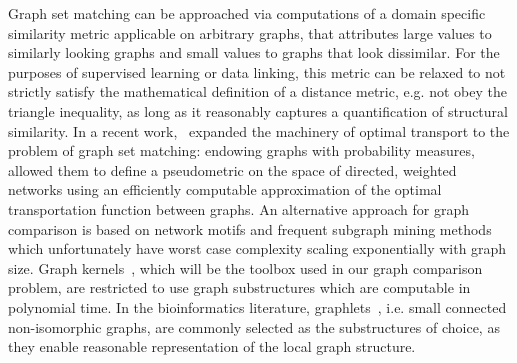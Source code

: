 Graph set matching can be approached via computations of a domain specific similarity metric applicable on arbitrary graphs, that attributes large values to similarly looking graphs and small values to graphs that look dissimilar. For the purposes of supervised learning or data linking, this metric can be relaxed to not strictly satisfy the mathematical definition of a distance metric, e.g. not obey the triangle inequality, as long as it reasonably captures a quantification of structural similarity. In a recent work,~\textcite{chowdhury19} expanded the machinery of optimal transport to the problem of graph set matching: endowing graphs with probability measures, allowed them to define a pseudometric on the space of directed, weighted networks using an efficiently computable approximation of the optimal transportation function between graphs. An alternative approach for graph comparison is based on network motifs and frequent subgraph mining methods~\citep{milo02,Yan2002} which unfortunately have worst case complexity scaling exponentially with graph size. Graph kernels~\citep{Vishwanathan2010}, which will be the toolbox used in our graph comparison problem, are restricted to use graph substructures which are computable in polynomial time. In the bioinformatics literature, graphlets~\citep{przulj07,shervashidze09}, i.e. small connected non-isomorphic graphs, are commonly selected as the substructures of choice, as they enable reasonable representation of the local graph structure.
